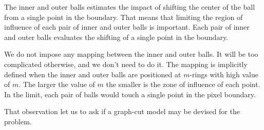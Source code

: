 	The inner and outer balls estimates the impact of shifting the center of the ball from a single point in the boundary. That means that limiting the region of influence of each pair of inner and outer balls is important. Each pair of inner and outer balls evaluates the shifting of a single point in the boundary.	
	
	We do not impose any mapping between the inner and outer balls. It will be too complicated otherwise, and we don't need to do it. The mapping is implicitly defined when the inner and outer balls are positioned at $m$-rings with high value of $m$. The larger the value of $m$ the smaller is the zone of influence of each point. In the limit, each pair of balls would touch a single point in the pixel boundary. 
	
	That observation let us to ask if a graph-cut model may be devised for the problem.
	
